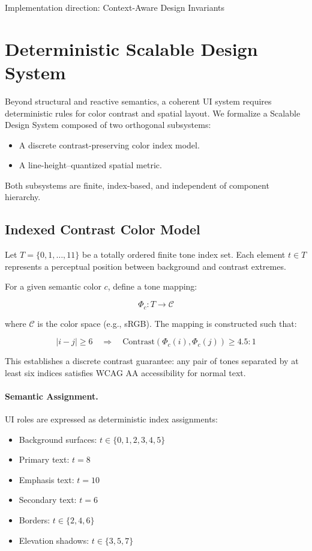 Implementation direction: Context-Aware Design Invariants \section{Deterministic Scalable Design System}

Beyond structural and reactive semantics, a coherent UI system
requires deterministic rules for color contrast and spatial layout.
We formalize a Scalable Design System composed of two orthogonal
subsystems:

\begin{itemize}
    \item A discrete contrast-preserving color index model.
    \item A line-height–quantized spatial metric.
\end{itemize}

Both subsystems are finite, index-based, and independent of
component hierarchy.

\subsection{Indexed Contrast Color Model}

Let $T = \{0,1,\dots,11\}$ be a totally ordered finite tone index set.
Each element $t \in T$ represents a perceptual position between
background and contrast extremes.

For a given semantic color $c$, define a tone mapping:

\[
\Phi_c : T \rightarrow \mathcal{C}
\]

where $\mathcal{C}$ is the color space (e.g., sRGB).
The mapping is constructed such that:

\begin{equation}
|i - j| \geq 6 \quad \Rightarrow \quad
\text{Contrast}(\Phi_c(i), \Phi_c(j)) \geq 4.5:1
\end{equation}

This establishes a discrete contrast guarantee:
any pair of tones separated by at least six indices
satisfies WCAG AA accessibility for normal text.

\paragraph{Semantic Assignment.}

UI roles are expressed as deterministic index assignments:

\begin{itemize}
    \item Background surfaces: $t \in \{0,1,2,3,4,5\}$
    \item Primary text: $t = 8$
    \item Emphasis text: $t = 10$
    \item Secondary text: $t = 6$
    \item Borders: $t \in \{2,4,6\}$
    \item Elevation shadows: $t \in \{3,5,7\}$
\end{itemize}

